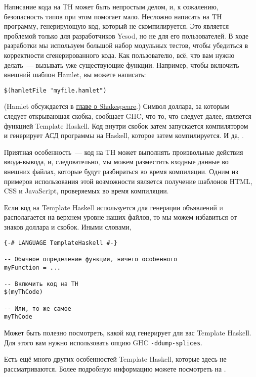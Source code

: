 Написание кода на TH может быть непростым делом, и, к сожалению, безопасность
типов при этом помогает мало. Несложно написать на TH программу, генерирующую
код, который не скомпилируется. Это является проблемой только для разработчиков
Yesod, но не для его пользователей. В ходе разработки мы используем большой
набор модульных тестов, чтобы убедиться в корректности сгенерированного кода.
Как пользователю, всё, что вам нужно делать~--- вызывать уже существующие
функции. Например, чтобы включить внешний шаблон Hamlet, вы можете написать:

\begin{lstlisting}
$(hamletFile "myfile.hamlet")
\end{lstlisting}

(Hamlet обсуждается в \hyperref[chap:shakespeare]{главе о Shakespeare}.) Символ
доллара, за которым следует открывающая скобка, сообщает GHC, что то, что
следует далее, является функцией Template Haskell. Код внутри скобок затем
запускается компилятором и генерирует АСД программы на Haskell, которое затем
компилируется. И да,
.

Приятная особенность~--- код на TH может выполнять произвольные действия
ввода-вывода, и, следовательно, мы можем разместить входные данные во внешних
файлах, которые будут разбираться во время компиляции. Одним из примеров
использования этой возможности является получение шаблонов HTML, CSS и
JavaScript, проверяемых во время компиляции.

Если код на Template Haskell используется для генерации объявлений и
располагается на верхнем уровне наших файлов, то мы можем избавиться от знаков
доллара и скобок. Иными словами,

\begin{lstlisting}
{-# LANGUAGE TemplateHaskell #-}

-- Обычное определение функции, ничего особенного
myFunction = ...

-- Включить код на TH
$(myThCode)

-- Или, то же самое
myThCode
\end{lstlisting}

Может быть полезно посмотреть, какой код генерирует для вас Template Haskell.
Для этого вам нужно использовать опцию GHC \texttt{-ddump-splices}.

\begin{remark}
    Есть ещё много других особенностей Template Haskell, которые здесь не
    рассматриваются. Более подробную информацию можете посмотреть на
    .
\end{remark}

